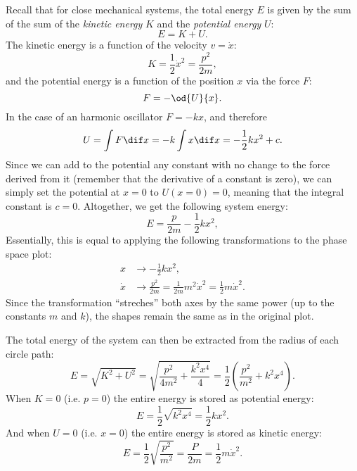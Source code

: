 Recall that for close mechanical systems, the total energy $E$ is given by the sum of the sum of the \textit{kinetic energy} $K$ and the \textit{potential energy} $U$:
\begin{equation}
  E = K + U.
  \label{eq:total_energy}
\end{equation}
The kinetic energy is a function of the velocity $v=\dot{x}$:
\begin{equation}
  K = \frac{1}{2}\dot{x}^{2} = \frac{p^{2}}{2m},
  \label{eq:kinetric_energy}
\end{equation}
and the potential energy is a function of the position $x$ via the force $F$:
\begin{equation}
  F = -\od{U}{x}.
  \label{eq:force_from_potential}
\end{equation}
In the case of an harmonic oscillator $F=-kx$, and therefore
\begin{equation}
  U = \int\displaystyle F \dif x = -k\int\displaystyle x \dif x = -\frac{1}{2}kx^{2} + c.
  \label{eq:potential_energy_harmonic_oscillator}
\end{equation}
Since we can add to the potential any constant with no change to the force derived from it (remember that the derivative of a constant is zero), we can simply set the potential at $x=0$ to $U\left(x=0\right)=0$, meaning that the integral constant is $c=0$. Altogether, we get the following system energy:
\begin{equation}
  E = \frac{p}{2m} - \frac{1}{2}kx^{2},
  \label{eq:total_energy_harmonic_oscillator}
\end{equation}
Essentially, this is equal to applying the following transformations to the phase space plot:
\begin{align}
  x &\to -\frac{1}{2}kx^{2},\\
  \dot{x} &\to \frac{p^{2}}{2m} = \frac{1}{2m}{m^{2}\dot{x}^{2}} = \frac{1}{2}m\dot{x}^{2}.
\end{align}
Since the transformation \enquote{streches} both axes by the same power (up to the constants $m$ and $k$), the shapes remain the same as in the original plot.

The total energy of the system can then be extracted from the radius of each circle path:
\begin{equation}
  E = \sqrt{K^{2}+U^{2}} = \sqrt{\frac{p^{2}}{4m^{2}} + \frac{k^{2}x^{4}}{4}} = \frac{1}{2}\left(\frac{p^{2}}{m^{2}}+k^{2}x^{4}\right).
  \label{eq:label}
\end{equation}
When $K=0$ (i.e. $p=0$) the entire energy is stored as potential energy:
\begin{equation}
  E = \frac{1}{2}\sqrt{k^{2}x^{4}} = \frac{1}{2}kx^{2}.
  \label{eq:label}
\end{equation}
And when $U=0$ (i.e. $x=0$) the entire energy is stored as kinetic energy:
\begin{equation}
  E = \frac{1}{2}\sqrt{\frac{p^{2}}{m^{2}}} = \frac{P}{2m} = \frac{1}{2}m\dot{x}^{2}.
  \label{eq:label}
\end{equation}


